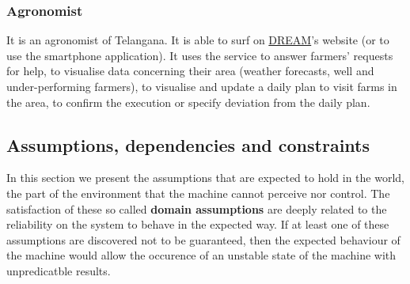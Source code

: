 \subsubsection{Agronomist}
It is an agronomist of Telangana. It is able to surf on \hyperref[tab:acronymsTable]{DREAM}’s website (or to use the smartphone application). It uses the service to answer farmers' requests for help, to visualise data concerning their area (weather forecasts, well and under-performing farmers), to visualise and update a daily plan to visit farms in the area, to confirm the execution or specify deviation from the daily plan.


\subsection{Assumptions, dependencies and constraints}
\label{sec:domain_assumptions}
In this section we present the assumptions that are expected to hold in the world, the part of the environment that the machine cannot perceive nor control. The satisfaction of these so called \textbf{domain assumptions} are deeply related to the reliability on the system to behave in the expected way. If at least one of these assumptions are discovered not to be guaranteed, then the expected behaviour of the machine would allow the occurence of an unstable state of the machine with unpredicatble results.
\newline\newline
{}
\newline\newline
{}
\newline\newline
{}

